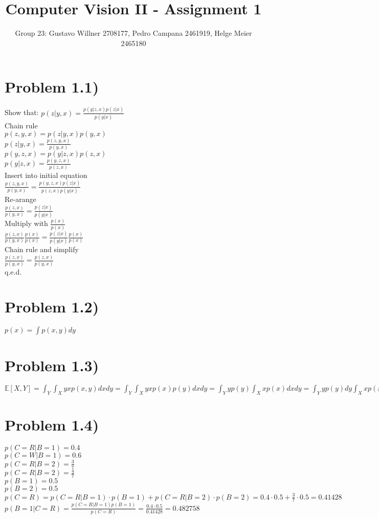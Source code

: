 \documentclass[11pt]{article} %
\title{Computer Vision II - Assignment 1}
\author{Group 23: Gustavo Willner 2708177, Pedro Campana 2461919, Helge Meier 2465180}
\date{}
\begin{document}
	\maketitle
	
	\section*{Problem 1.1)}
	Show that: $p(z \lvert y,x) = \frac{p(y \lvert z,x)p(z \lvert x)}{p(y \lvert x)}$\\
	Chain rule\\
	$p(z,y,x) = p(z \lvert y,x) p(y,x)$\\
	$p(z \lvert y,x) = \frac{p(z,y,x)}{p(y,x)} $\\
	$p(y,z,x) = p(y \lvert z,x) p(z,x)$\\
	$p(y \lvert z,x) = \frac{p(y,z,x)}{p(z,x)} $\\
	Insert into initial equation\\
	$\frac{p(z,y,x)}{p(y,x)}  = \frac{p(y,z,x)p(z \lvert x)}{p(z,x) p(y \lvert x)} $\\
	Re-arange\\
	$\frac{p(z,x)}{p(y,x)}  = \frac{p(z \lvert x)}{p(y \lvert x)} $\\
	Multiply with $\frac{p(x)}{p(x)}$\\
	$\frac{p(z,x)}{p(y,x)}\frac{p(x)}{p(x)}  = \frac{p(z \lvert x)}{p(y \lvert x)}\frac{p(x)}{p(x)} $\\
	Chain rule and simplify\\
	$\frac{p(z,x)}{p(y,x)}  = \frac{p(z , x)}{p(y , x)} $\\
	q.e.d.
	\section*{Problem 1.2)}
	$p(x) = \int p(x,y) dy$
	\section*{Problem 1.3)}
	$\mathbb{E}\left[X,Y\right] = \int_{Y} \int_{X} yxp(x,y) dxdy = \int_{Y} \int_{X} yxp(x)p(y) dxdy = \int_{Y} yp(y) \int_{X} xp(x) dxdy = \int_{Y} yp(y) dy\int_{X} xp(x) dx = \mathbb{E}\left[Y\right]\mathbb{E}\left[X\right]$\\
	\section*{Problem 1.4)}
	$p(C=R \lvert B=1) = 0.4$\\
	$p(C=W \lvert B=1) = 0.6$\\
	$p(C=R \lvert B=2) = \frac{3}{7}$\\
	$p(C=R \lvert B=2) = \frac{4}{7}$\\
	$p(B=1) = 0.5$\\
	$p(B=2) = 0.5$\\
	$p(C=R) = p(C=R \lvert B=1) \cdot p(B=1) + p(C=R \lvert B=2) \cdot p(B=2) = 0.4 \cdot 0.5 + \frac{3}{7}\cdot 0.5 = 0.41428$\\
	$p(B=1 \lvert C=R) = \frac{p(C=R \lvert B=1)p(B=1)}{p(C=R)} = \frac{0.4 \cdot 0.5}{0.41428} = 0.482758$\\
\end{document}
